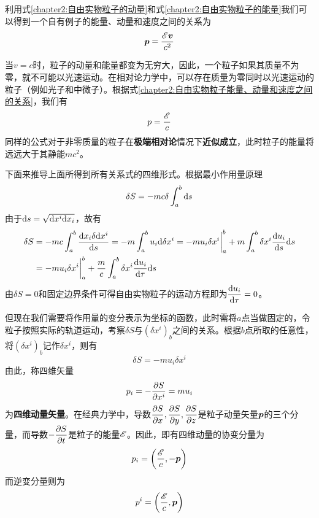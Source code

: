 利用式\eqref{chapter2:自由实物粒子的动量}和式\eqref{chapter2:自由实物粒子的能量}我们可以得到一个自有例子的能量、动量和速度之间的关系为
\begin{equation}
	\boldsymbol{p} = \frac{\mathscr{E} \boldsymbol{v}}{c^2}
	\label{chapter2:自由实物粒子能量、动量和速度之间的关系}
\end{equation}

当$v=c$时，粒子的动量和能量都变为无穷大，因此，一个粒子如果其质量不为零，就不可能以光速运动。在相对论力学中，可以存在质量为零同时以光速运动的粒子（例如光子和中微子）。根据式\eqref{chapter2:自由实物粒子能量、动量和速度之间的关系}，我们有
\begin{equation}
	p = \frac{\mathscr{E}}{c}
\end{equation}
同样的公式对于非零质量的粒子在{\bf 极端相对论}情况下{\bf 近似成立}，此时粒子的能量将远远大于其静能$mc^2$。

下面来推导上面所得到所有关系式的四维形式。根据最小作用量原理
\begin{equation*}
	\delta S = -mc\delta\int_a^b \mathrm{d} s
\end{equation*}
由于$\mathrm{d} s = \sqrt{\mathrm{d} x^i\mathrm{d} x_i}$，故有
\begin{align*}
	\delta S & = -mc\int_a^b \frac{\mathrm{d} x_i\delta \mathrm{d} x^i}{\mathrm{d} s} = -m\int_a^b u_i\mathrm{d} \delta x^i = -mu_i\delta x^i\bigg|_a^b + m\int_a^b \delta x^i \frac{\mathrm{d} u_i}{\mathrm{d} s}\mathrm{d} s \\
	& = -mu_i\delta x^i\bigg|_a^b + \frac{m}{c}\int_a^b \delta x^i \frac{\mathrm{d} u_i}{\mathrm{d} \tau}\mathrm{d} s
\end{align*}
由$\delta S = 0$和固定边界条件可得自由实物粒子的运动方程即为$\dfrac{\mathrm{d} u_i}{\mathrm{d} \tau} = 0$。

但现在我们需要将作用量的变分表示为坐标的函数，此时需将$a$点当做固定的，令粒子按照实际的轨道运动，考察$\delta S$与$(\delta x^i)_b$之间的关系。根据$b$点所取的任意性，将$(\delta x^i)_b$记作$\delta x^i$，则有
\begin{equation}
	\delta S = -mu_i\delta x^i
\end{equation}
由此，称四维矢量
\begin{equation}
	p_i = -\frac{\partial S}{\partial x^i} = mu_i
	\label{chapter2:四维动量矢量}
\end{equation}
为{\bf 四维动量矢量}。在经典力学中，导数$\dfrac{\partial S}{\partial x}, \dfrac{\partial S}{\partial y}, \dfrac{\partial S}{\partial z}$是粒子动量矢量$\boldsymbol{p}$的三个分量，而导数$-\dfrac{\partial S}{\partial t}$是粒子的能量$\mathscr{E}$。因此，即有四维动量的协变分量为
\begin{equation}
	p_i = \left(\frac{\mathscr{E}}{c},-\boldsymbol{p}\right)
	\label{chapter2:四维动量矢量的协变分量}
\end{equation}
而逆变分量则为
\begin{equation}
	p^i = \left(\frac{\mathscr{E}}{c},\boldsymbol{p}\right)
	\label{chapter2:四维动量矢量的逆变分量}
\end{equation}

